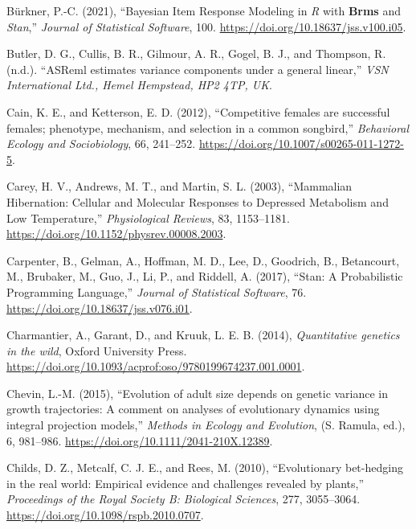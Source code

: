 \documentclass[
  12pt,
  letterpaper,
]{scrartcl}
\newlength{\cslhangindent}
\newenvironment{CSLReferences}[2] %
 {\begin{list}{}{%
  \setlength{\itemindent}{0pt}
  \setlength{\leftmargin}{0pt}
  \setlength{\parsep}{0pt}
  \ifodd #1
   \setlength{\leftmargin}{\cslhangindent}
   \setlength{\itemindent}{-1\cslhangindent}
  \fi
  \setlength{\itemsep}{#2\baselineskip}}}
 {\end{list}}
\begin{document}
\begin{CSLReferences}{1}{0}
Bürkner, P.-C. (2021), {``Bayesian {Item Response Modeling} in
{\emph{R}} with {\textbf{Brms}} and {\emph{Stan}},''} \emph{Journal of
Statistical Software}, 100. \url{https://doi.org/10.18637/jss.v100.i05}.

Butler, D. G., Cullis, B. R., Gilmour, A. R., Gogel, B. J., and
Thompson, R. (n.d.). {``{ASReml} estimates variance components under a
general linear,''} \emph{VSN International Ltd., Hemel Hempstead, HP2
4TP, UK}.

Cain, K. E., and Ketterson, E. D. (2012), {``Competitive females are
successful females; phenotype, mechanism, and selection in a common
songbird,''} \emph{Behavioral Ecology and Sociobiology}, 66, 241--252.
\url{https://doi.org/10.1007/s00265-011-1272-5}.

Carey, H. V., Andrews, M. T., and Martin, S. L. (2003), {``Mammalian
{Hibernation}: {Cellular} and {Molecular Responses} to {Depressed
Metabolism} and {Low Temperature},''} \emph{Physiological Reviews}, 83,
1153--1181. \url{https://doi.org/10.1152/physrev.00008.2003}.

Carpenter, B., Gelman, A., Hoffman, M. D., Lee, D., Goodrich, B.,
Betancourt, M., Brubaker, M., Guo, J., Li, P., and Riddell, A. (2017),
{``Stan: {A Probabilistic Programming Language},''} \emph{Journal of
Statistical Software}, 76. \url{https://doi.org/10.18637/jss.v076.i01}.

Charmantier, A., Garant, D., and Kruuk, L. E. B. (2014),
\emph{Quantitative genetics in the wild}, Oxford University Press.
\url{https://doi.org/10.1093/acprof:oso/9780199674237.001.0001}.

Chevin, L.-M. (2015), {``Evolution of adult size depends on genetic
variance in growth trajectories: A comment on analyses of evolutionary
dynamics using integral projection models,''} \emph{Methods in Ecology
and Evolution}, (S. Ramula, ed.), 6, 981--986.
\url{https://doi.org/10.1111/2041-210X.12389}.

Childs, D. Z., Metcalf, C. J. E., and Rees, M. (2010), {``Evolutionary
bet-hedging in the real world: {Empirical} evidence and challenges
revealed by plants,''} \emph{Proceedings of the Royal Society B:
Biological Sciences}, 277, 3055--3064.
\url{https://doi.org/10.1098/rspb.2010.0707}.


\end{CSLReferences}
\end{document}
